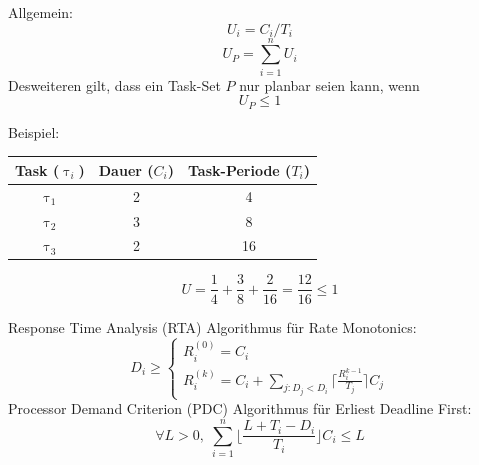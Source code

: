 \begin{frame}{\subsecname}
	Allgemein:
	\begin{equation}
		U_i = C_i / T_i
	\end{equation}
	\begin{equation}
		U_P = \sum_{i=1}^n U_i
	\end{equation}
	Desweiteren gilt, dass ein Task-Set $P$ nur planbar seien kann, wenn
	\begin{equation}
		U_P \leq 1
	\end{equation}
\end{frame}

\begin{frame}{\subsecname}
	Beispiel:
	\begin{tabular}{c||c|c}
		Task ($\uptau_i$) & Dauer ($C_i$) & Task-Periode ($T_i$)\\\hline\hline
		$\uptau_1$ & 2 & 4\\
		$\uptau_2$ & 3 & 8\\
		$\uptau_3$ & 2 & 16
	\end{tabular}
	\begin{equation}
		U = \frac{1}{4} + \frac{3}{8} + \frac{2}{16} = \frac{12}{16} \leq 1
	\end{equation}
\end{frame}

\begin{frame}{\subsecname}
	Response Time Analysis (RTA) Algorithmus für Rate Monotonics:
	\begin{equation}
		D_i \geq
		\begin{cases}
   				R_i^{(0)}=C_i \\
   				R_i^{(k)}=C_i+ \sum_{j:D_j<D_i} \lceil \frac{R_i^{k-1}}{T_j}\rceil C_j
  		\end{cases}
	\end{equation}
	Processor Demand Criterion (PDC) Algorithmus für Erliest Deadline First:
	\begin{equation}
		\forall L > 0,\; \sum_{i=1}^n\lfloor \frac{L+T_i-D_i}{T_i}\rfloor C_i \leq L
	\end{equation}
\end{frame}

